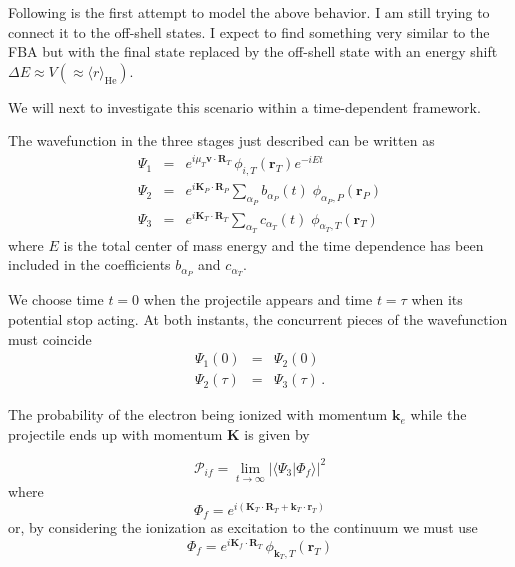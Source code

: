 Following is the first attempt to model the above behavior. I am still
trying to connect it to the off-shell states. I expect to find
something very similar to the FBA but with the final state replaced by
the off-shell state with an energy shift $\Delta E \approx V(\approx
\langle r \rangle_{\mathrm{He}})$.

We will next to investigate this scenario within a time-dependent
framework.

The wavefunction in the three stages just described can be written as
\begin{eqnarray}\label{Q:wave-funct-stage}
\Psi_{1}&=& e^{i \mu_{T} \bm{v} \cdot \bm{R}_{T}} \,
\phi_{i,T}(\bm{r}_{T}) e^{- i E t}
\nonumber \\
\Psi_{2} &=& e^{i \bm{K}_{P} \cdot \bm{R}_{P}} \sum_{\alpha_{P}}
b_{\alpha_{P}}(t) \; \phi_{\alpha_{P}, P}(\bm{r}_{P})
\\
\Psi_{3} &=& e^{i \bm{K}_{T} \cdot \bm{R}_{T}} \sum_{\alpha_{T}}
c_{\alpha_{T}}(t) \; \phi_{\alpha_{T}, T}(\bm{r}_{T}) \nonumber
\end{eqnarray}
where $E$ is the total center of mass energy and the time dependence
has been included in the coefficients $b_{\alpha_{P}}$ and
$c_{\alpha_{T}}$.

We choose time $t=0$ when the projectile appears and time $t=\tau $
when its potential stop acting. At both instants, the concurrent pieces
of the wavefunction must coincide
%
\begin{eqnarray}\label{Q:bound-cond}
\Psi_{1}(0) &=& \Psi_{2}(0) \nonumber
  \\
\Psi_{2}(\tau) &=& \Psi_{3}(\tau) \,.
\end{eqnarray}

The probability of the electron being ionized with momentum
$\bm{k}_{e}$ while the projectile ends up with momentum $\bm{K}$ is
given by

\begin{equation}\label{Q:Prob-ion-1}
\mathcal{P}_{if} = \lim_{t \to \infty} \left|\langle \Psi_{3} |
\Phi_{f} \rangle\right|^{2}
\end{equation}
%
where
\begin{equation} \label{Q:fi-f-a}
\Phi_{f} = e^{i \left( \bm{K}_{T} \cdot \bm{R}_{T} + \bm{k}_{T}
\cdot \bm{r}_{T}\right)}
\end{equation}
%
or, by considering the ionization as excitation to the continuum we
must use
%
\begin{equation}\label{Q:fi-f-b}
\Phi_{f} = e^{i \bm{K}_{f} \cdot \bm{R}_{T}} \,
\phi_{\bm{k}_{T},T}(\bm{r}_{T})
\end{equation}


